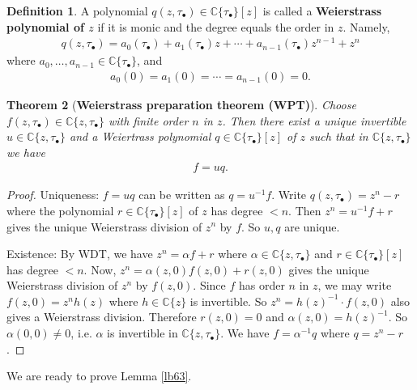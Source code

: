 \documentclass[12pt,b5paper,notitlepage]{report}
\theoremstyle{definition}
\newtheorem{df}{Definition}[section]
\theoremstyle{plain}
\newtheorem{thm}[df]{Theorem}
\newcommand{\blt}{\bullet}
\newcommand{\Cbb}{\mathbb C}
\numberwithin{equation}{section}
\begin{document}
\begin{df}
A polynomial $q(z,\tau_\blt)\in\Cbb\{\tau_\blt\}[z]$ is called a \textbf{Weierstrass polynomial of $z$}  if it is monic and the degree equals the order in $z$. Namely,
\begin{align}
q(z,\tau_\blt)=a_0(\tau_\blt)+a_1(\tau_\blt)z+\cdots+a_{n-1}(\tau_\blt)z^{n-1}
+z^n
\end{align}
where $a_0,\dots,a_{n-1}\in\Cbb\{\tau_\blt\}$, and
\begin{align*}
a_0(0)=a_1(0)=\cdots=a_{n-1}(0)=0.
\end{align*}
\end{df}

\begin{thm}[\textbf{Weierstrass preparation theorem (WPT)}]
Choose $f(z,\tau_\blt)\in\Cbb\{z,\tau_\blt\}$ with finite order $n$ in $z$. Then there exist a unique invertible $u\in\Cbb\{z,\tau_\blt\}$ and a Weiertrass polynomial $q\in\Cbb\{\tau_\blt\}[z]$ of $z$ such that in $\Cbb\{z,\tau_\blt\}$ we have
\begin{align*}
f=uq.
\end{align*}
\end{thm}

\begin{proof}
Uniqueness: $f=uq$ can be written as $q=u^{-1}f$. Write $q(z,\tau_\blt)=z^n-r$ where the polynomial $r\in\Cbb\{\tau_\blt\}[z]$ of $z$ has degree $<n$. Then $z^n=u^{-1}f+r$ gives the unique Weierstrass division of $z^n$ by $f$. So $u,q$ are unique.  

Existence: By WDT, we have $z^n=\alpha f+r$ where $\alpha\in\Cbb\{z,\tau_\blt\}$ and $r\in\Cbb\{\tau_\blt\}[z]$ has degree $<n$. Now, $z^n=\alpha(z,0)f(z,0)+r(z,0)$ gives the unique Weierstrass division of $z^n$ by $f(z,0)$. Since $f$ has order $n$ in $z$, we may write $f(z,0)=z^nh(z)$ where $h\in\Cbb\{z\}$ is invertible. So $z^n=h(z)^{-1}\cdot f(z,0)$ also gives a Weierstrass division. Therefore $r(z,0)=0$ and $\alpha(z,0)=h(z)^{-1}$. So $\alpha(0,0)\neq 0$, i.e. $\alpha$ is invertible in $\Cbb\{z,\tau_\blt\}$. We have $f=\alpha^{-1}q$ where $q=z^n-r$.
\end{proof}



We are ready to prove Lemma \ref{lb63}.
\end{document}
